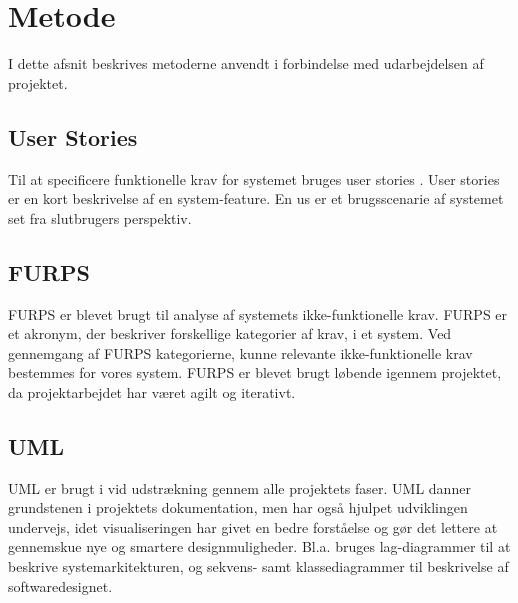 \chapter{Metode}
I dette afsnit beskrives metoderne anvendt i forbindelse med udarbejdelsen af projektet.

\section{User Stories}
Til at specificere funktionelle krav for systemet bruges user stories \cite{margaretrouse2015}. User stories er en kort beskrivelse af en system-feature. En \gls{us} er et brugsscenarie af systemet set fra slutbrugers perspektiv.

\section{FURPS}
FURPS er blevet brugt til analyse af systemets ikke-funktionelle krav. FURPS er et akronym, der beskriver forskellige kategorier af krav, i et system. Ved gennemgang af FURPS kategorierne, kunne relevante ikke-funktionelle krav bestemmes for vores system. FURPS er blevet brugt løbende igennem projektet, da projektarbejdet har været agilt og iterativt.

\section{UML}
UML er brugt i vid udstrækning gennem alle projektets faser. UML danner grundstenen i projektets dokumentation, men har også hjulpet udviklingen undervejs, idet visualiseringen har givet en bedre forståelse og gør det lettere at gennemskue nye og smartere designmuligheder. Bl.a. bruges lag-diagrammer til at beskrive systemarkitekturen, og sekvens- samt klassediagrammer til beskrivelse af softwaredesignet.



